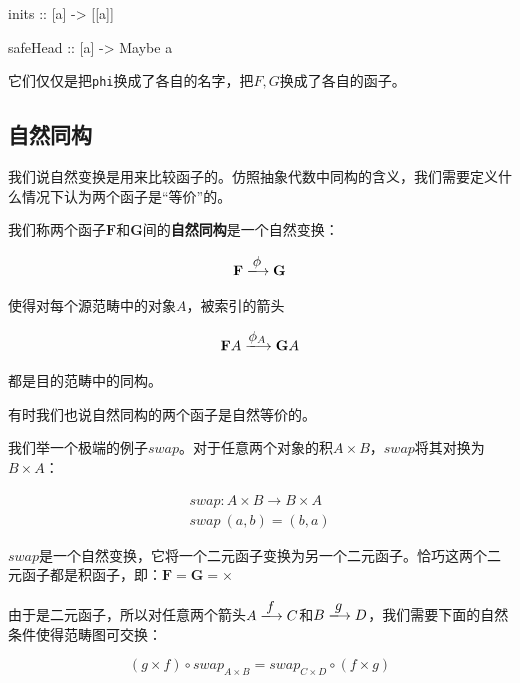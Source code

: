 \documentclass[b5paper]{ctexart}
\begin{document}
\begin{Haskell}
inits :: [a] -> [[a]]

safeHead :: [a] -> Maybe a
\end{Haskell}

它们仅仅是把\texttt{phi}换成了各自的名字，把$F, G$换成了各自的函子。

\subsection{自然同构}

我们说自然变换是用来比较函子的。仿照抽象代数中同构的含义，我们需要定义什么情况下认为两个函子是“等价”的。

\begin{definition}
我们称两个函子$\mathbf{F}$和$\mathbf{G}$间的\textbf{自然同构}是一个自然变换：

\[
  \mathbf{F} \arrowto{\phi} \mathbf{G}
\]

使得对每个源范畴中的对象$A$，被索引的箭头

\[
  \mathbf{F}A \arrowto{\phi_A} \mathbf{G}A
\]

都是目的范畴中的同构。
\end{definition}

有时我们也说自然同构的两个函子是自然等价的。 %

我们举一个极端的例子$swap$。对于任意两个对象的积$A \times B$，$swap$将其对换为$B \times A$：

\[
\begin{array}{l}
swap : A \times B \to B \times A \\
swap\ (a, b) = (b, a)
\end{array}
\]

$swap$是一个自然变换，它将一个二元函子变换为另一个二元函子。恰巧这两个二元函子都是积函子，即：$\mathbf{F} = \mathbf{G} = \times$

由于是二元函子，所以对任意两个箭头$A \arrowto{f} C$和$B \arrowto{g} D$，我们需要下面的自然条件使得范畴图可交换：


\[
(g \times f) \circ swap_{A \times B} = swap_{C \times D} \circ (f \times g)
\]

\begin{center}
\end{center}
\end{document}
